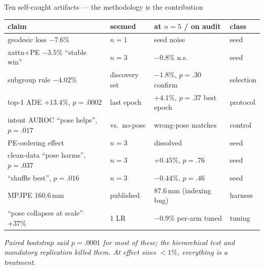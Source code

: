 \documentclass[10pt,aspectratio=169]{beamer}
\begin{document}
\begin{frame}{Ten self-caught artifacts --- the methodology is the contribution}
\begin{center}\footnotesize
\begin{tabular}{llll}
\toprule
claim & seemed & at $n{=}5$ / on audit & class \\
\midrule
geodesic loss $-7.6\%$ & $n{=}1$ & seed noise & seed \\
xattn+PE $-3.5\%$ ``stable win'' & $n{=}3$ & $-0.8\%$ n.s. & seed \\
subgroup rule $-4.02\%$ & discovery set & $-1.8\%$, $p{=}.30$ confirm & selection \\
top-1 ADE $+13.4\%$, $p{=}.0002$ & last epoch & $+4.1\%$, $p{=}.37$ best epoch & protocol \\
intent AUROC ``pose helps'', $p{=}.017$ & vs.\ no-pose & wrong-pose matches & control \\
PE-ordering effect & $n{=}3$ & dissolved & seed \\
clean-data ``pose harms'', $p{=}.037$ & $n{=}3$ & $+0.45\%$, $p{=}.76$ & seed \\
``shuffle best'', $p{=}.016$ & $n{=}3$ & $-0.44\%$, $p{=}.46$ & seed \\
MPJPE 160.6\,mm & published & 87.6\,mm (indexing bug) & harness \\
``pose collapses at scale'' $+37\%$ & 1 LR & $-0.9\%$ per-arm tuned & tuning \\
\bottomrule
\end{tabular}
\end{center}
\emph{Paired bootstrap said $p{=}.0001$ for most of these; the hierarchical test and
mandatory replication killed them. At effect sizes $<1\%$, everything is a treatment.}
\end{frame}
\end{document}
